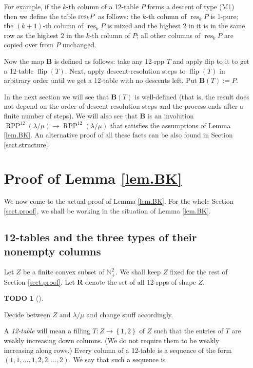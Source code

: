 \documentclass[numbers=enddot,12pt,final,onecolumn,notitlepage]{scrartcl}%
\theoremstyle{definition}
\newtheorem{quest}[theo]{TODO}
\newenvironment{todo}[1][]
{\begin{quest}[#1]\begin{leftbar}}
{\end{leftbar}\end{quest}}
\def\B{{\mathbf{B}}}
\def\OneTwoRPP{{\operatorname*{RPP}^{12}\left(  \lambda/\mu\right)}}
\def\flip{{\operatorname*{flip}}}
\begin{document}
For example, if the $k$-th column of a 12-table $P$ forms a descent of type (M1) then we define the table ${\operatorname*{res}\nolimits_{k}} P$ as follows: the $k$-th column of $\operatorname*{res}_{k}P$ is 1-pure; the $\left(  k+1\right)  $-th column of $\operatorname*{res}%
\nolimits_{k}P$ is mixed and the highest $2$ in it is in the same row as the highest $2$ in the $k$-th column of $P$; all other columns of $\operatorname*{res}\nolimits_{k}P$ are
copied over from $P$ unchanged.

Now the map $\B$ is defined as follows: take any 12-rpp $T$ and apply flip to it to get a 12-table $\flip(T)$. Next, apply descent-resolution steps to $\flip(T)$ in arbitrary order until we get a 12-table with no descents left. Put $\B(T):=P$. 

In the next section we will see that $\B(T)$ is well-defined (that is, the result does not depend on the order of descent-resolution steps and the process ends after a finite number of steps). We will also see that $\B$ is an involution $\OneTwoRPP\to\OneTwoRPP$ that satisfies the assumptions of Lemma \ref{lem.BK}. An alternative proof of all these facts can be also found in Section \ref{sect.structure}.


\section{\label{sect.proof}Proof of Lemma \ref{lem.BK}}

We now come to the actual proof of Lemma \ref{lem.BK}. For the whole Section
\ref{sect.proof}, we shall be working in the situation of Lemma \ref{lem.BK}.

\subsection{\label{subsect.fourtypes}12-tables and the three types of their nonempty
columns}

Let $Z$ be a finite convex subset of $\mathbb{N}_{+}^{2}$. We shall keep $Z$
fixed for the rest of Section \ref{sect.proof}. Let $\mathbf{R}$ denote the set
of all 12-rpps of shape $Z$.

\begin{todo}
Decide between $Z$ and $\lambda/\mu$ and change stuff accordingly.
\end{todo}

A \textit{12-table} will mean a filling $T:Z\rightarrow\left\{  1,2\right\}  $
of $Z$
such that the entries of $T$ are weakly increasing down columns. (We do not
require them to be weakly increasing along rows.) Every column of a 12-table
is a sequence of the form $(1,1,\ldots,1,2,2,\ldots,2)$. We say that such a sequence is
\end{document}
